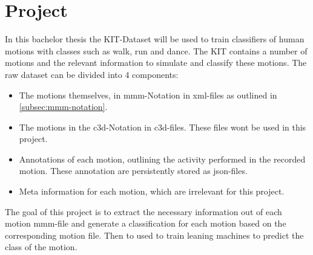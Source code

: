\chapter{Project}
In this bachelor thesis the KIT-Dataset\cite{Plappert2016} will be used to train classifiers of human motions with classes such as walk, run and dance. The KIT contains a number of motions and the relevant information to simulate and classify these motions. The raw dataset can be divided into 4 components:
\begin{itemize}
	\item The motions themselves, in mmm-Notation in xml-files as outlined in \ref{subsec:mmm-notation}.
	\item The motions in the c3d-Notation in c3d-files. These files wont be used in this project.
	\item Annotations of each motion, outlining the activity performed in the recorded motion. These annotation are persistently stored as json-files.
	\item Meta information for each motion, which are irrelevant for this project.
\end{itemize}
The goal of this project is to extract the necessary information out of each motion mmm-file and generate a classification for each motion based on the corresponding motion file. Then to used to train leaning machines to predict the class of the motion.
\newpage
